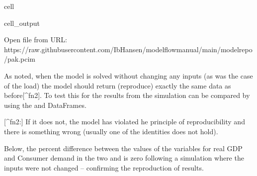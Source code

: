 \documentclass[letterpaper,10pt,english]{jupyterBook}
\begin{document}
\begin{sphinxuseclass}{cell}
\begin{sphinxVerbatimOutput}
\begin{sphinxuseclass}{cell_output}
\begin{sphinxVerbatim}[commandchars=\\\{\}]
Open file from URL:  https://raw.githubusercontent.com/IbHansen/modelflow\PYGZhy{}manual/main/model\PYGZus{}repo/pak.pcim
\end{sphinxVerbatim}

\end{sphinxuseclass}\end{sphinxVerbatimOutput}

\end{sphinxuseclass}
\sphinxAtStartPar
As noted, when the model is solved without changing any inputs (as was the case of the load) the model should return (reproduce) exactly the same data as before{[}\textasciicircum{}fn2{]}.  To test this for  the results from the simulation can be compared by using the  and  DataFrames.

\sphinxAtStartPar
{[}\textasciicircum{}fn2:{]} If it does not, the model has violated he principle of reproducibility and there is something wrong (usually one of the identities does not hold).

\sphinxAtStartPar
Below, the percent difference between the values of the variables for real GDP and Consumer demand in the two   and  is zero following a simulation where the inputs were not changed – confirming the reproduction of results.
\end{document}
